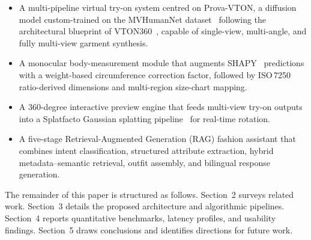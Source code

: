 \begin{itemize}[leftmargin=*]
    \item A multi-pipeline virtual try-on system centred on Prova-VTON, a diffusion model custom-trained on the MVHumanNet dataset~\cite{zheng2024mvhumannet} following the architectural blueprint of VTON360~\cite{he2025vton360}, capable of single-view, multi-angle, and fully multi-view garment synthesis.
    \item A monocular body-measurement module that augments SHAPY~\cite{choutas2022shapy} predictions with a weight-based circumference correction factor, followed by ISO\,7250 ratio-derived dimensions and multi-region size-chart mapping.
    \item A 360-degree interactive preview engine that feeds multi-view try-on outputs into a Splatfacto Gaussian splatting pipeline~\cite{tancik2023nerfstudio} for real-time rotation.
    \item A five-stage Retrieval-Augmented Generation (RAG) fashion assistant that combines intent classification, structured attribute extraction, hybrid metadata--semantic retrieval, outfit assembly, and bilingual response generation.
\end{itemize}

The remainder of this paper is structured as follows. Section~2 surveys related work. Section~3 details the proposed architecture and algorithmic pipelines. Section~4 reports quantitative benchmarks, latency profiles, and usability findings. Section~5 draws conclusions and identifies directions for future work.
